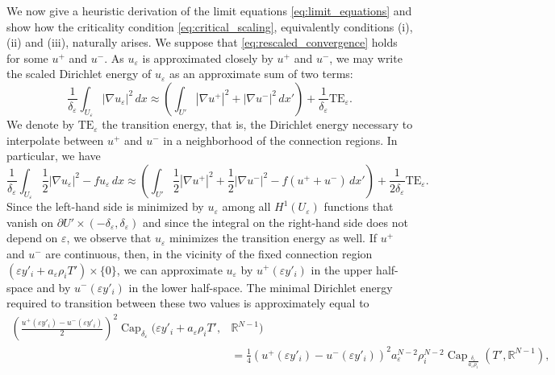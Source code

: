 \documentclass{article}
\numberwithin{equation}{section}
\theoremstyle{definition}
\theoremstyle{remark}
\newcommand{\cpct}{\operatorname{Cap}}
\begin{document}
We now give a heuristic derivation of the limit equations \eqref{eq:limit_equations} and show how the criticality condition \eqref{eq:critical_scaling}, equivalently conditions (i), (ii) and (iii), naturally arises. We suppose that \eqref{eq:rescaled_convergence} holds for some $u^+$ and $u^-$. As $u_\varepsilon$ is approximated closely by $u^+$ and $u^-$, we may write the scaled Dirichlet energy of $u_\varepsilon$ as an approximate sum of two terms:
\[
\frac{1}{\delta_\varepsilon} \int_{U_\varepsilon} |\nabla u_\varepsilon|^2 \, dx \approx \left(\int_{U'} |\nabla u^+|^2 + |\nabla u^-|^2 \, dx' \right) + \frac{1}{\delta_\varepsilon}\mathrm{TE}_\varepsilon.
\]
We denote by $\mathrm{TE}_\varepsilon$ the transition energy, that is, the Dirichlet energy necessary to interpolate between $u^+$ and $u^-$ in a neighborhood of the connection regions. In particular, we have
\begin{equation} \label{eq:energy_partition}
    \frac{1}{\delta_\varepsilon} \int_{U_\varepsilon} \frac{1}{2} |\nabla u_\varepsilon|^2 - f u_\varepsilon \, dx \approx \left(\int_{U'} \frac{1}{2} |\nabla u^+|^2 + \frac{1}{2} |\nabla u^-|^2 - f(u^+ + u^-) \, dx' \right) + \frac{1}{2\delta_\varepsilon} \mathrm{TE}_\varepsilon.
\end{equation}
Since the left-hand side is minimized by $u_\varepsilon$ among all $H^1(U_\varepsilon)$ functions that vanish on $\partial U' \times (-\delta_\varepsilon, \delta_\varepsilon)$ and since the integral on the right-hand side does not depend on $\varepsilon$, we observe that $u_\varepsilon$ minimizes the transition energy as well. If $u^+$ and $u^-$ are continuous, then, in the vicinity of the fixed connection region $(\varepsilon y'_i + a_\varepsilon \rho_i T') \times \{0\}$, we can approximate $u_\varepsilon$ by $u^+(\varepsilon y'_i)$ in the upper half-space and by $u^-(\varepsilon y'_i)$ in the lower half-space. The minimal Dirichlet energy required to transition between these two values is approximately equal to
\begin{equation} \label{eq:approximate_transition_energy}
    \begin{aligned}
        \left(\frac{u^+(\varepsilon y'_i) - u^-(\varepsilon y'_i)}{2}\right)^2 \cpct_{\delta_\varepsilon}(\varepsilon y'_i + a_\varepsilon \rho_i T', &\mathbb{R}^{N - 1}) \\
        &= \frac{1}{4}(u^+(\varepsilon y'_i) - u^-(\varepsilon y'_i))^2 a_\varepsilon^{N - 2} \rho_i^{N - 2} \cpct_{\frac{\delta_\varepsilon}{a_\varepsilon \rho_i}}(T', \mathbb{R}^{N - 1}),
    \end{aligned}
\end{equation}
\end{document}
